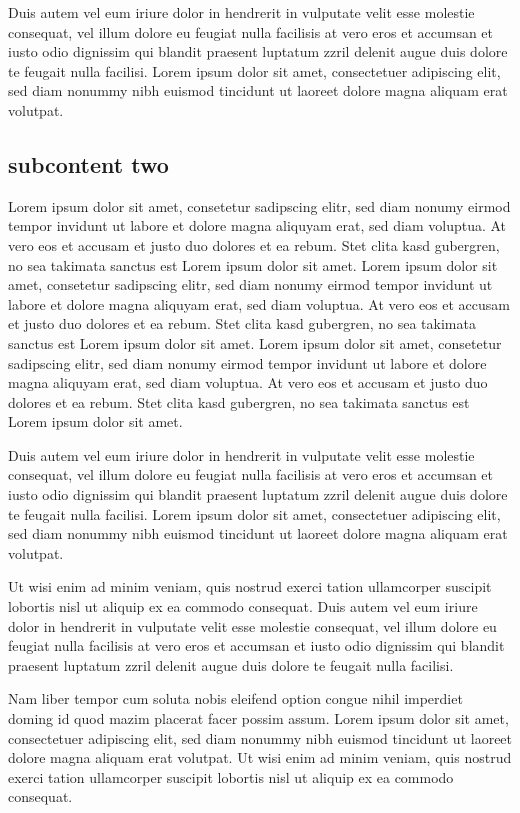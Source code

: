 Duis autem vel eum iriure dolor in hendrerit in vulputate velit esse molestie
consequat, vel illum dolore eu feugiat nulla facilisis at vero eros et accumsan
et iusto odio dignissim qui blandit praesent luptatum zzril delenit augue duis
dolore te feugait nulla facilisi. Lorem ipsum dolor sit amet, consectetuer
adipiscing elit, sed diam nonummy nibh euismod tincidunt ut laoreet dolore magna
aliquam erat volutpat.



\clearpage
\subsection{subcontent two}  
 Lorem ipsum dolor sit amet, consetetur sadipscing elitr, sed diam nonumy eirmod
 tempor invidunt ut labore et dolore magna aliquyam erat, sed diam voluptua. At
 vero eos et accusam et justo duo dolores et ea rebum. Stet clita kasd
 gubergren, no sea takimata sanctus est Lorem ipsum dolor sit amet. Lorem ipsum
 dolor sit amet, consetetur sadipscing elitr, sed diam nonumy eirmod tempor
 invidunt ut labore et dolore magna aliquyam erat, sed diam voluptua. At vero
 eos et accusam et justo duo dolores et ea rebum. Stet clita kasd gubergren, no
 sea takimata sanctus est Lorem ipsum dolor sit amet. Lorem ipsum dolor sit
 amet, consetetur sadipscing elitr, sed diam nonumy eirmod tempor invidunt ut
 labore et dolore magna aliquyam erat, sed diam voluptua. At vero eos et accusam
 et justo duo dolores et ea rebum. Stet clita kasd gubergren, no sea takimata
 sanctus est Lorem ipsum dolor sit amet.

Duis autem vel eum iriure dolor in hendrerit in vulputate velit esse molestie
consequat, vel illum dolore eu feugiat nulla facilisis at vero eros et accumsan
et iusto odio dignissim qui blandit praesent luptatum zzril delenit augue duis
dolore te feugait nulla facilisi. Lorem ipsum dolor sit amet, consectetuer
adipiscing elit, sed diam nonummy nibh euismod tincidunt ut laoreet dolore magna
aliquam erat volutpat.

Ut wisi enim ad minim veniam, quis nostrud exerci tation ullamcorper suscipit
lobortis nisl ut aliquip ex ea commodo consequat. Duis autem vel eum iriure
dolor in hendrerit in vulputate velit esse molestie consequat, vel illum dolore
eu feugiat nulla facilisis at vero eros et accumsan et iusto odio dignissim qui
blandit praesent luptatum zzril delenit augue duis dolore te feugait nulla
facilisi.

Nam liber tempor cum soluta nobis eleifend option congue nihil imperdiet doming
id quod mazim placerat facer possim assum. Lorem ipsum dolor sit amet,
consectetuer adipiscing elit, sed diam nonummy nibh euismod tincidunt ut laoreet
dolore magna aliquam erat volutpat. Ut wisi enim ad minim veniam, quis nostrud
exerci tation ullamcorper suscipit lobortis nisl ut aliquip ex ea commodo
consequat.

